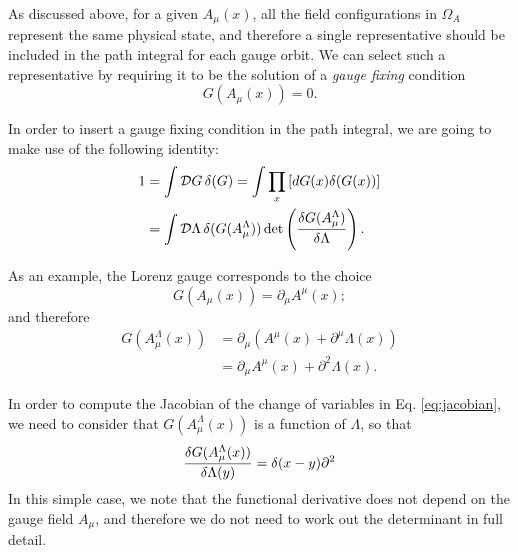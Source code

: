 \documentclass{article}
\numberwithin{equation}{section}
\begin{document}
As discussed above, for a given $A_\mu(x)$, all the field configurations in $\Omega_A$ represent the same physical state, and therefore a single representative should be included in the path integral for each gauge orbit. We can select such a representative by requiring it to be the solution of a \textit{gauge fixing} condition 
\begin{equation}
    G(A_\mu(x)) = 0.
\end{equation}

In order to insert a gauge fixing condition in the path integral, we are going to make use of the following identity:
\begin{align}
    1 &= \int \mathcal{D} G\, \delta(G) = \int \prod_x \left[dG(x)\delta(G(x))\right] \\
    &= \int \mathcal{D} \Lambda \, \delta(G(A_\mu^\Lambda)) \det\left(\fdv{G(A_\mu^\Lambda)}{\Lambda}\right). \label{eq:jacobian}
\end{align}


As an example, the Lorenz gauge corresponds to the choice 
\begin{equation}
    G(A_\mu(x)) = \partial_\mu A^\mu(x);
\end{equation}
and therefore 
\begin{equation}
\begin{aligned}
    G(A_\mu^\Lambda(x)) &= \partial_\mu(A^\mu(x) + \partial^\mu \Lambda(x)) \\
    &= \partial_\mu A^\mu(x) + \partial^2 \Lambda(x).
\end{aligned}
\end{equation}

In order to compute the Jacobian of the change of variables in Eq. \ref{eq:jacobian}, we need to consider that $G(A_\mu^\Lambda(x))$ is a function of $\Lambda$, so that 
\begin{equation}
    \fdv{G(A_\mu^\Lambda(x))}{\Lambda(y)} = \delta(x-y) \partial^2
\end{equation}
In this simple case, we note that the functional derivative does not depend on the gauge field $A_\mu$, and therefore we do not need to work out the determinant in full detail.
\end{document}
